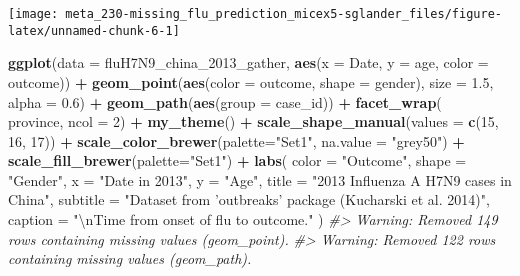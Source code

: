 \documentclass[]{book}
\newenvironment{Shaded}{\begin{snugshade}}{\end{snugshade}}
\newcommand{\CharTok}[1]{\textcolor[rgb]{0.31,0.60,0.02}{#1}}
\newcommand{\CommentTok}[1]{\textcolor[rgb]{0.56,0.35,0.01}{\textit{#1}}}
\newcommand{\DataTypeTok}[1]{\textcolor[rgb]{0.13,0.29,0.53}{#1}}
\newcommand{\DecValTok}[1]{\textcolor[rgb]{0.00,0.00,0.81}{#1}}
\newcommand{\FloatTok}[1]{\textcolor[rgb]{0.00,0.00,0.81}{#1}}
\newcommand{\KeywordTok}[1]{\textcolor[rgb]{0.13,0.29,0.53}{\textbf{#1}}}
\newcommand{\NormalTok}[1]{#1}
\newcommand{\OperatorTok}[1]{\textcolor[rgb]{0.81,0.36,0.00}{\textbf{#1}}}
\newcommand{\StringTok}[1]{\textcolor[rgb]{0.31,0.60,0.02}{#1}}
\begin{document}
\begin{center}\texttt{[image: meta\_230-missing\_flu\_prediction\_micex5-sglander\_files/figure-latex/unnamed-chunk-6-1]} \end{center}

\begin{Shaded}
\begin{Highlighting}[]
\KeywordTok{ggplot}\NormalTok{(}\DataTypeTok{data =}\NormalTok{ fluH7N9_china_}\DecValTok{2013}\NormalTok{_gather, }\KeywordTok{aes}\NormalTok{(}\DataTypeTok{x =}\NormalTok{ Date, }\DataTypeTok{y =}\NormalTok{ age, }\DataTypeTok{color =}\NormalTok{ outcome)) }\OperatorTok{+}
\StringTok{  }\KeywordTok{geom_point}\NormalTok{(}\KeywordTok{aes}\NormalTok{(}\DataTypeTok{color =}\NormalTok{ outcome, }\DataTypeTok{shape =}\NormalTok{ gender), }\DataTypeTok{size =} \FloatTok{1.5}\NormalTok{, }\DataTypeTok{alpha =} \FloatTok{0.6}\NormalTok{) }\OperatorTok{+}
\StringTok{  }\KeywordTok{geom_path}\NormalTok{(}\KeywordTok{aes}\NormalTok{(}\DataTypeTok{group =}\NormalTok{ case_id)) }\OperatorTok{+}
\StringTok{  }\KeywordTok{facet_wrap}\NormalTok{( }\OperatorTok{~}\StringTok{ }\NormalTok{province, }\DataTypeTok{ncol =} \DecValTok{2}\NormalTok{) }\OperatorTok{+}
\StringTok{  }\KeywordTok{my_theme}\NormalTok{() }\OperatorTok{+}
\StringTok{  }\KeywordTok{scale_shape_manual}\NormalTok{(}\DataTypeTok{values =} \KeywordTok{c}\NormalTok{(}\DecValTok{15}\NormalTok{, }\DecValTok{16}\NormalTok{, }\DecValTok{17}\NormalTok{)) }\OperatorTok{+}
\StringTok{  }\KeywordTok{scale_color_brewer}\NormalTok{(}\DataTypeTok{palette=}\StringTok{"Set1"}\NormalTok{, }\DataTypeTok{na.value =} \StringTok{"grey50"}\NormalTok{) }\OperatorTok{+}
\StringTok{  }\KeywordTok{scale_fill_brewer}\NormalTok{(}\DataTypeTok{palette=}\StringTok{"Set1"}\NormalTok{) }\OperatorTok{+}
\StringTok{  }\KeywordTok{labs}\NormalTok{(}
    \DataTypeTok{color =} \StringTok{"Outcome"}\NormalTok{,}
    \DataTypeTok{shape =} \StringTok{"Gender"}\NormalTok{,}
    \DataTypeTok{x =} \StringTok{"Date in 2013"}\NormalTok{,}
    \DataTypeTok{y =} \StringTok{"Age"}\NormalTok{,}
    \DataTypeTok{title =} \StringTok{"2013 Influenza A H7N9 cases in China"}\NormalTok{,}
    \DataTypeTok{subtitle =} \StringTok{"Dataset from 'outbreaks' package (Kucharski et al. 2014)"}\NormalTok{,}
    \DataTypeTok{caption =} \StringTok{"}\CharTok{\textbackslash{}n}\StringTok{Time from onset of flu to outcome."}
\NormalTok{  )}
\CommentTok{#> Warning: Removed 149 rows containing missing values (geom_point).}
\CommentTok{#> Warning: Removed 122 rows containing missing values (geom_path).}
\end{Highlighting}
\end{Shaded}
\end{document}
